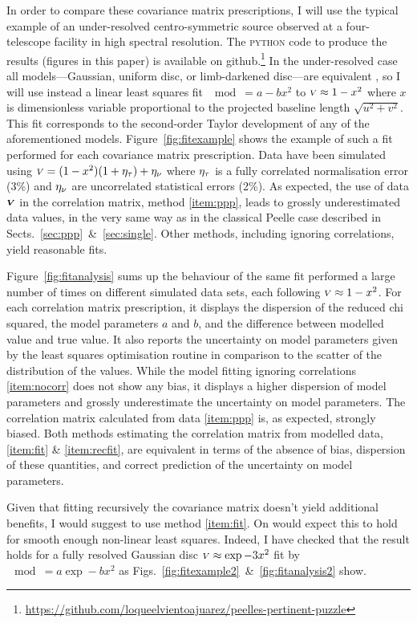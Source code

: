\documentclass{pasa}
\begin{document}
In order to compare these covariance matrix prescriptions, I will use the typical example of an under-resolved centro-symmetric source observed at a four-telescope facility in high spectral resolution. The \textsc{python} code to produce the results (figures in this paper) is available on github.\footnote{\url{https://github.com/loqueelvientoajuarez/peelles-pertinent-puzzle}} In the under-resolved case all models---Gaussian, uniform disc, or limb-darkened disc---are equivalent \citep{LAC03}, so I will use instead a linear least squares fit $\mod = a - bx^2$ to ${\scriptstyle V} \approx 1 - x^2$ where $x$ is dimensionless variable proportional to the projected baseline length $\sqrt{u^2+v^2}$. This fit corresponds to the second-order Taylor development of any of the aforementioned models.  Figure~\ref{fig:fitexample} shows the example of such a fit performed for each covariance matrix prescription.  Data have been simulated using ${\scriptstyle V} = (1-x^2)(1 + \eta_\tau) + \eta_\nu$ where $\eta_\tau$ is a fully correlated normalisation error (3\%) and $\eta_\nu$ are uncorrelated statistical errors (2\%). As expected, the use of data $\boldsymbol{{\scriptstyle V}}$ in the correlation matrix, method \ref{item:ppp}, leads to grossly underestimated data values, in the very same way as in the classical Peelle case described in Sects.~\ref{sec:ppp}~\&~\ref{sec:single}.  Other methods, including ignoring correlations, yield reasonable fits.

Figure~\ref{fig:fitanalysis} sums up the behaviour of the same fit performed a large number of times on different simulated data sets, each following ${\scriptstyle V} \approx 1-x^2$.  For each correlation matrix prescription, it displays the dispersion of the reduced chi squared, the model parameters $a$ and $b$, and the difference between modelled value and true value. It also reports the uncertainty on model parameters given by the least squares optimisation routine in comparison to the scatter of the distribution of the values. While the model fitting ignoring correlations \ref{item:nocorr} does not show any bias, it displays a higher dispersion of model parameters and grossly underestimate the uncertainty on model parameters.  The correlation matrix calculated from data \ref{item:ppp} is, as expected, strongly biased. Both methods estimating the correlation  matrix from modelled data, \ref{item:fit} \& \ref{item:recfit}, are equivalent in terms of the absence of bias, dispersion of these quantities, and correct prediction of the uncertainty on model parameters.

Given that fitting recursively the covariance matrix doesn't yield additional benefits, I would suggest to use method \ref{item:fit}. On would expect this to hold for smooth enough non-linear least squares. Indeed, I have checked that the result holds for a fully resolved Gaussian disc ${\scriptstyle V} \approx \exp -3x^2$ fit by $\mod = a\exp -bx^2$ as Figs.~\ref{fig:fitexample2}~\&~\ref{fig:fitanalysis2} show.
\end{document}
